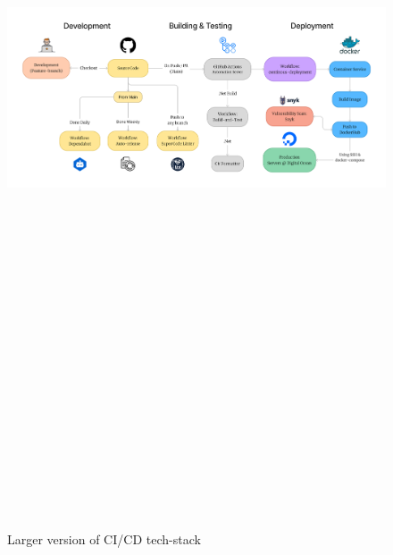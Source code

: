\begin{figure}[H]
    \centering
    \includegraphics[angle=90, height=720pt]{Report/Images/CICD_Chain.png} 
    \caption{Larger version of CI/CD tech-stack}
    \label{fig:Vertical CI/CD tech-stack}
\end{figure}
\newpage






